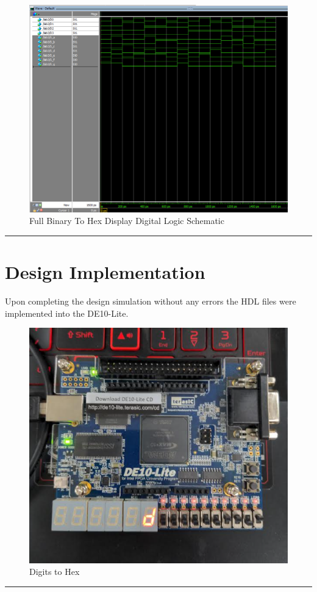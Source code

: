 \documentclass{article}
\begin{document}
\begin{figure}[H]
  \centering
  \includegraphics[width=1\textwidth]{seg_sim.png}
  \caption{Full Binary To Hex Display Digital Logic Schematic}
\end{figure}
\vspace{5mm}
\hrule

\section*{\textcolor{mycolor}{Design Implementation}}
Upon completing the design simulation without any errors the HDL files were implemented into the DE10-Lite.
\begin{figure}[H]
  \centering
  \includegraphics[width=.7\textwidth]{lab_imp.png}
  \caption{Digits to Hex}
\end{figure}
\vspace{5mm}
\hrule
\end{document}
